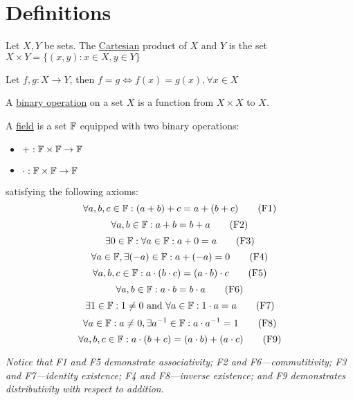 \chapter{Definitions}

\begin{mydef}
\normalfont Let \(X,Y\) be sets. The \underline{Cartesian} product of \(X\) and \(Y\) is the set \(X \times Y = \{(x, y) : x \in X, y \in Y\}\)
\end{mydef}

\begin{mydef}
\normalfont Let \(f, g : X \to Y\), then \(f = g \Leftrightarrow f(x) = g(x), \forall x \in X\)
\end{mydef}

\begin{mydef}
\normalfont A \underline{binary operation} on a set \(X\) is a function from \(X \times X\) to \(X\).
\end{mydef}

\begin{mydef}
\normalfont A \underline{field} is a set \(\mathbb{F}\) equipped with two binary operations: 
\begin{itemize}
	\item \(+: \mathbb{F} \times \mathbb{F} \to \mathbb{F}\)
	\item \(\cdot: \mathbb{F} \times \mathbb{F} \to \mathbb{F}\)
\end{itemize}
%
satisfying the following axioms:
\begin{equation}\forall a,b,c \in \mathbb{F} : (a + b) + c = a + (b + c) \tag{F1}\end{equation}
\begin{equation}\forall a,b \in \mathbb{F} : a + b = b + a \tag{F2} \end{equation}
\begin{equation}\exists 0 \in \mathbb{F} : \forall a \in \mathbb{F} : a + 0 = a \tag{F3}\end{equation}
\begin{equation}\forall a \in \mathbb{F}, \exists(-a)\in\mathbb{F}:a+(-a)=0 \tag{F4}\end{equation}
%
\begin{equation}\forall a,b,c\in\mathbb{F} : a\cdot(b \cdot c) = (a \cdot b) \cdot c \tag{F5}\end{equation}
\begin{equation}\forall a,b\in\mathbb{F} : a \cdot b = b \cdot a \tag{F6}\end{equation}
\begin{equation}\exists 1\in\mathbb{F} : 1 \ne 0 \text{ and } \forall a\in\mathbb{F} : 1\cdot a = a \tag{F7}\end{equation}
\begin{equation}\forall a\in\mathbb{F} : a\ne 0, \exists a^{-1} \in \mathbb{F} : a\cdot a^{-1} = 1 \tag{F8}\end{equation}
%
\begin{equation}\forall a,b,c\in\mathbb{F}:a\cdot(b+c) = (a\cdot b) + (a\cdot c) \tag{F9}\end{equation}

\textit{Notice that F1 and F5 demonstrate associativity; F2 and F6---commutitivity; F3 and F7---identity existence; F4 and F8---inverse existence; and F9 demonstrates distributivity with respect to addition}.
\end{mydef}